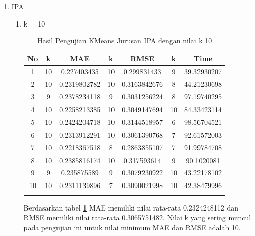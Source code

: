 \begin{enumerate}
    \item IPA
        \begin{enumerate}
            \item k = 10 \\
                \begin{longtable}[H]{|c|c|c|c|c|c|c|}
                    \hline
                    No & k & MAE & k & RMSE & k & Time \\
                    \hline
                    1 & 10 & 0.227403435  & 10 & 0.299831433 & 9 & 39.32930207\\
                    \hline
                    2 & 10 & 0.2319802782  & 10 & 0.3163842676 & 8 & 44.21230698\\
                    \hline
                    3 & 9 & 0.2378234118 & 9 & 0.3031256224 & 8 & 97.19740295\\
                    \hline
                    4 & 10 & 0.2258213385 & 10 & 0.3049147694 & 10 & 84.33423114\\
                    \hline
                    5 & 10 & 0.2424204718 & 10 & 0.3144518957 & 6 & 98.56704521\\
                    \hline
                    6 & 10 & 0.2313912291 & 10 & 0.3061390768 & 7 & 92.61572003\\
                    \hline
                    7 & 10 & 0.2218367518 & 8 & 0.2863855107 & 7 & 91.99784708\\
                    \hline
                    8 & 10 & 0.2385816174 & 10 & 0.317593614 & 9 & 90.1020081\\
                    \hline
                    9 & 9 & 0.235875589 & 9 & 0.3079230922 & 10 & 43.22178102\\
                    \hline
                    10 & 10 & 0.2311139896 & 7 & 0.3090021998 & 10 & 42.38479996\\
                    \hline
                    
                    \caption{Hasil Pengujian KMeans Jurusan IPA dengan nilai k 10}
                    \label{tab:ipa k = 10}
                \end{longtable}
            
            Berdasarkan tabel \ref{tab:ipa k = 10} MAE memiliki nilai rata-rata 0.2324248112 dan RMSE memiliki nilai rata-rata 0.3065751482. Nilai k yang sering muncul pada pengujian ini untuk nilai minimum MAE dan RMSE adalah 10.
            

\end{enumerate}
\end{enumerate}
